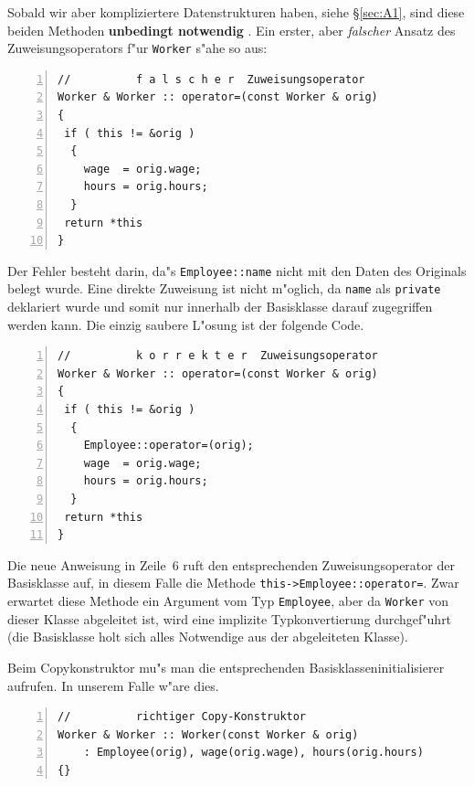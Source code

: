 Sobald wir aber kompliziertere Datenstrukturen haben, siehe \S\ref{sec:A1},
sind diese beiden Methoden \textbf{unbedingt notwendig} \cite[\S16]{Meyers:1998:ECP}.
Ein erster, aber \textit{falscher}
Ansatz des Zuweisungsoperators f"ur \texttt{Worker} s"ahe so aus:
%
\begin{lstlisting}[caption={Falscher Zuweisungsoperator},label=lst:wrong_assignment,
basicstyle=\scriptsize,numbers=left, numberstyle=\tiny, stepnumber=2, numbersep=5pt]
//			f a l s c h e r  Zuweisungsoperator
Worker & Worker :: operator=(const Worker & orig)
{
 if ( this != &orig )
  {
    wage  = orig.wage;
    hours = orig.hours;
  }
 return *this
}
\end{lstlisting}
%
Der Fehler besteht darin, da"s \verb|Employee::name| nicht mit den Daten des
Originals belegt wurde. Eine direkte Zuweisung ist nicht m"oglich,
da \texttt{name} als \texttt{private} deklariert wurde und somit nur innerhalb
der Basisklasse darauf zugegriffen werden kann. Die einzig saubere L"osung
ist der folgende Code.
\begin{lstlisting}[caption={Korrekter Zuweisungsoperator},label=lst:correct_assignment,
basicstyle=\scriptsize,numbers=left, numberstyle=\tiny, stepnumber=2, numbersep=5pt]
//			k o r r e k t e r  Zuweisungsoperator
Worker & Worker :: operator=(const Worker & orig)
{
 if ( this != &orig )
  {
    Employee::operator=(orig);
    wage  = orig.wage;
    hours = orig.hours;
  }
 return *this
}
\end{lstlisting}
Die neue Anweisung in Zeile~6 ruft den entsprechenden Zuweisungsoperator der
Basisklasse auf, in diesem Falle die Methode \verb|this->Employee::operator=|.
Zwar erwartet diese Methode ein Argument vom Typ \texttt{Employee},  aber da
\texttt{Worker} von dieser Klasse abgeleitet ist, wird eine implizite
Typkonvertierung durchgef"uhrt (die Basisklasse holt sich alles Notwendige  aus der abgeleiteten Klasse).

Beim Copykonstruktor mu"s man die entsprechenden Basisklasseninitialisierer
aufrufen. In unserem Falle w"are dies.
%
\begin{lstlisting}[caption={Korrekter Kopierkonstruktor},label=lst:correct_copyconstructor,
basicstyle=\scriptsize,numbers=left, numberstyle=\tiny, stepnumber=2, numbersep=5pt]
//			richtiger Copy-Konstruktor
Worker & Worker :: Worker(const Worker & orig)
	: Employee(orig), wage(orig.wage), hours(orig.hours)
{}
\end{lstlisting}
%
%
%
%
